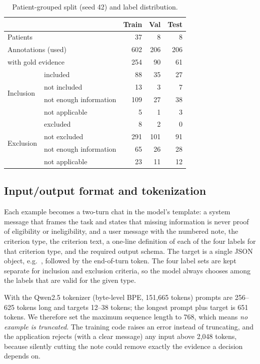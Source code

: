 \begin{table}[t]
\centering
\caption{Patient-grouped split (seed 42) and label distribution.}
\label{tab:split}
\setlength{\tabcolsep}{4pt}
\begin{tabular}{llrrr}
\toprule
 & & Train & Val & Test \\
\midrule
\multicolumn{2}{l}{Patients} & 37 & 8 & 8 \\
\multicolumn{2}{l}{Annotations (used)} & 602 & 206 & 206 \\
\multicolumn{2}{l}{\quad with gold evidence} & 254 & 90 & 61 \\
\midrule
\multirow{4}{*}{Inclusion} & included & 88 & 35 & 27 \\
 & not included & 13 & 3 & 7 \\
 & not enough information & 109 & 27 & 38 \\
 & not applicable & 5 & 1 & 3 \\
\midrule
\multirow{4}{*}{Exclusion} & excluded & 8 & 2 & 0 \\
 & not excluded & 291 & 101 & 91 \\
 & not enough information & 65 & 26 & 28 \\
 & not applicable & 23 & 11 & 12 \\
\bottomrule
\end{tabular}
\end{table}

\subsection{Input/output format and tokenization}
\label{sec:format}
Each example becomes a two-turn chat in the model's template: a system message that frames the task
and states that missing information is never proof of eligibility or ineligibility, and a user
message with the numbered note, the criterion type, the criterion text, a one-line definition of each
of the four labels for that criterion type, and the required output schema. The target is a single
JSON object, e.g.\ , followed by the end-of-turn
token. The four label sets are kept separate for inclusion and exclusion criteria, so the model always
chooses among the labels that are valid for the given type.

With the Qwen2.5 tokenizer (byte-level BPE, 151,665 tokens) prompts are 256--625 tokens long and
targets 12--38 tokens; the longest prompt plus target is 651 tokens. We therefore set the maximum
sequence length to 768, which means \emph{no example is truncated}. The training code raises an error
instead of truncating, and the application rejects (with a clear message) any input above 2,048
tokens, because silently cutting the note could remove exactly the evidence a decision depends on.

